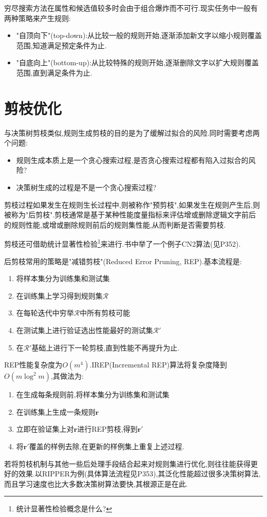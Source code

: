 穷尽搜索方法在属性和候选值较多时会由于组合爆炸而不可行.现实任务中一般有两种策略来产生规则:
\begin{itemize}
\item "自顶向下"(top-down):从比较一般的规则开始,逐渐添加新文字以缩小规则覆盖范围,知道满足预定条件为止.
\item "自底向上"(bottom-up):从比较特殊的规则开始,逐渐删除文字以扩大规则覆盖范围,直到满足条件为止.
\end{itemize}

\section{剪枝优化}

与决策树剪枝类似,规则生成剪枝的目的是为了缓解过拟合的风险.同时需要考虑两个问题:
\begin{itemize}
\item 规则生成本质上是一个贪心搜索过程,是否贪心搜索过程都有陷入过拟合的风险?
\item 决策树生成的过程是不是一个贪心搜索过程?
\end{itemize}

剪枝过程如果发生在规则生长过程中,则被称作"预剪枝",如果发生在规则产生后,则被称为"后剪枝".剪枝通常是基于某种性能度量指标来评估增或删除逻辑文字前后的规则性能,或增或删除规则前后的规则集性能,从而判断是否需要剪枝.

剪枝还可借助统计显著性检验\footnote{统计显著性检验概念是什么?}来进行.书中举了一个例子CN2算法(见P352).

后剪枝常用的策略是"减错剪枝"(Reduced Error Pruning, REP).基本流程是:
\begin{enumerate}
\item 将样本集分为训练集和测试集
\item 在训练集上学习得到规则集$\mathcal R$
\item 在每轮迭代中穷举$\mathcal R$中所有剪枝可能
\item 在测试集上进行验证选出性能最好的测试集$\mathcal R'$
\item 在$\mathcal R'$基础上进行下一轮剪枝,直到性能不再提升为止.
\end{enumerate}

REP性能复杂度为$O(m^4)$.IREP(Incremental REP)算法将复杂度降到$O(m\log^2m)$,其做法为:
\begin{enumerate}
\item 在生成每条规则前,将样本集分为训练集和测试集
\item 在训练集上生成一条规则$\mathbf r$
\item 立即在验证集上对$\mathbf r$进行REP剪枝,得到$\mathbf r'$
\item 将$\mathbf r'$覆盖的样例去除,在更新的样例集上重复上述过程.
\end{enumerate}
若将剪枝机制与其他一些后处理手段结合起来对规则集进行优化,则往往能获得更好的效果.以RIPPER为例(具体算法流程见P353),其泛化性能超过很多决策树算法,而且学习速度也比大多数决策树算法要快,其根源正是在此.

